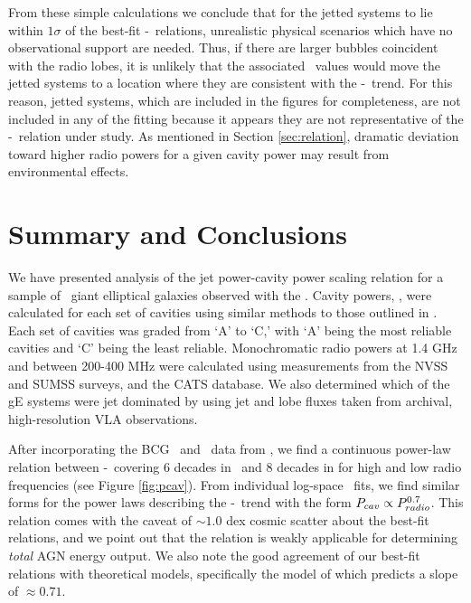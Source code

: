 \documentclass{emulateapj}
\begin{document}
From these simple calculations we conclude that for the jetted systems
to lie within $1\sigma$ of the best-fit \pcav-\prad\ relations,
unrealistic physical scenarios which have no observational support are
needed. Thus, if there are larger bubbles coincident with the radio
lobes, it is unlikely that the associated \pcav\ values would move the
jetted systems to a location where they are consistent with the
\pcav-\prad\ trend. For this reason, jetted systems, which are
included in the figures for completeness, are not included in any of
the fitting because it appears they are not representative of the
\pcav-\prad\ relation under study. As mentioned in Section
\ref{sec:relation}, dramatic deviation toward higher radio powers for
a given cavity power may result from environmental effects.

\section{Summary and Conclusions}
\label{sec:summary}

We have presented analysis of the jet power-cavity power scaling
relation for a sample of \samp\ giant elliptical galaxies observed
with the \cxo. Cavity powers, \pcav, were calculated for each set of
cavities using similar methods to those outlined in
\citet{rafferty06}. Each set of cavities was graded from `A' to `C,'
with `A' being the most reliable cavities and `C' being the least
reliable. Monochromatic radio powers at 1.4 GHz and between 200-400
MHz were calculated using measurements from the NVSS and SUMSS
surveys, and the CATS database. We also determined which of the gE
systems were jet dominated by using jet and lobe fluxes taken from
archival, high-resolution VLA observations.

After incorporating the BCG \pcav\ and \prad\ data from
\citet{birzan08}, we find a continuous power-law relation between
\pcav-\prad\ covering 6 decades in \prad\ and 8 decades in \pcav for
high and low radio frequencies (see Figure \ref{fig:pcav}). From
individual log-space \bces\ fits, we find similar forms for the power
laws describing the \pcav-\prad\ trend with the form $P_{cav} \propto
P_{radio}^{0.7}$. This relation comes with the caveat of $\sim 1.0$ dex
cosmic scatter about the best-fit relations, and we point out that the
relation is weakly applicable for determining {\it{total}} AGN energy
output. We also note the good agreement of our best-fit relations with
theoretical models, specifically the model of
\citet{1979ApJ...232...34B} which predicts a slope of $\approx 0.71$.
\end{document}
